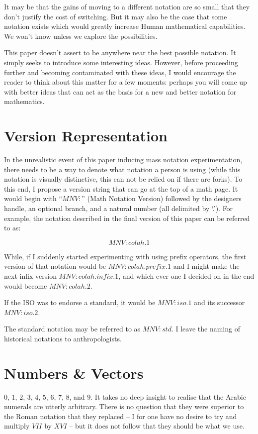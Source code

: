 It may be that the gains of moving to a different notation are so small that they don't justify the cost of switching. But it may also be the case that some notation exists which would greatly increase Human mathematical capabilities. We won't know unless we explore the possibilities.

This paper doesn't assert to be anywhere near the best possible notation. It simply seeks to introduce some interesting ideas. However, before proceeding further and becoming contaminated with these ideas, I would encourage the reader to think about this matter for a few moments: perhaps you will come up with better ideas that can act as the basis for a new and better notation for mathematics.


\section{Version Representation}

In the unrealistic event of this paper inducing mass notation experimentation, there needs to be a way to denote what notation a person is using (while this notation is visually distinctive, this can not be relied on if there are forks). To this end, I propose a version string that can go at the top of a math page. It would begin with ``$MNV\!:$'' (Math Notation Version) followed by the designers handle, an optional branch, and a natural number (all delimited by `.'). For example, the notation described in the final version of this paper can be referred to as:

$$MNV\!:\!colah.1$$

While, if I suddenly started experimenting with using prefix operators, the first version of that notation would be $MNV\!:\!colah.prefix.1$ and I might make the next infix version $MNV\!:\!colah.infix.1$, and which ever one I decided on in the end would become $MNV\!:\!colah.2$.

If the ISO was to endorse a standard, it would be $MNV\!:\!iso.1$ and its successor $MNV\!:\!iso.2$.

The standard notation may be referred to as $MNV\!:\!std$. I leave the naming of historical notations to anthropologists.


\section{Numbers \& Vectors}

$0$, $1$, $2$, $3$, $4$, $5$, $6$, $7$, $8$, and $9$. It takes no deep insight to realise that the Arabic numerals are utterly arbitrary. There is no question that they were superior to the Roman notation that they replaced -- I for one have no desire to try and multiply $VII$ by $XVI$ -- but it does not follow that they should be what we use.

